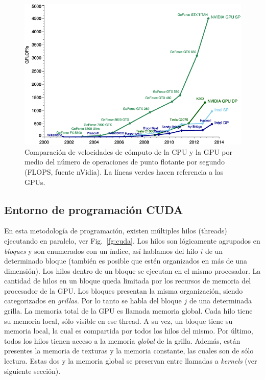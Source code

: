 \begin{figure}[h]
\begin{center}
\includegraphics[width=12cm]{figures/cpugpu}
\end{center}
\caption[Comparación de velocidades de cómputo de la CPU y la GPU]{Comparación de velocidades de cómputo de la CPU y la GPU por medio del número de operaciones de punto flotante por segundo (FLOPS, fuente nVidia). La líneas verdes hacen referencia a las GPUs.}
\label{fg:cpugpu}
\end{figure}



\subsection{Entorno de programación CUDA}
En esta metodolog\'ia de programaci\'on, existen m\'ultiples hilos (threads) ejecutando en paralelo, ver Fig.~\ref{fg:cuda}.
Los hilos son l\'ogicamente agrupados en {\em bloques} y son enumerados con un \'indice, as\'i hablamos del hilo $i$ de un determinado bloque (también es posible que estén organizados en más de una dimensión).
Los hilos dentro de un bloque se ejecutan en el mismo procesador.
La cantidad de hilos en un bloque queda limitada por los recursos de memoria del procesador de la GPU. Los bloques presentan la misma organizaci\'on, siendo categorizados en {\em grillas}. 
Por lo tanto se habla del bloque $j$ de una determinada grilla.
La memoria total de la GPU es llamada memoria global. Cada hilo tiene su memoria local, s\'olo visible en ese thread.
A su vez, un bloque tiene su memoria local, la cual es compartida por todos los hilos del mismo.
Por \'ultimo, todos los hilos tienen acceso a la memoria {\em global} de la grilla.
Adem\'as, est\'an presentes la memoria de texturas y la memoria constante, las cuales son de s\'olo lectura.
Estas dos y la memoria global se preservan entre llamadas a {\em kernels} (ver siguiente secci\'on).

